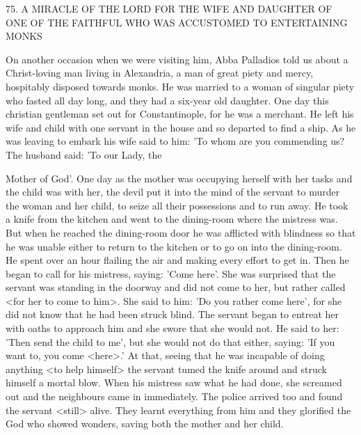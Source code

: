 75. A MIRACLE OF THE LORD FOR THE WIFE
AND DAUGHTER OF ONE OF THE FAITHFUL WHO
WAS ACCUSTOMED TO ENTERTAINING MONKS

On another occasion when we were visiting him, Abba Palladios
told us about a Christ-loving man living in Alexandria, a man of
great piety and mercy, hospitably disposed towards monks. He was
married to a woman of singular piety who fasted all day long, and
they had a six-year old daughter. One day this christian gentleman
set out for Constantinople, for he was a merchant. He left his wife
and child with one servant in the house and so departed to find a
ship. As he was leaving to embark his wife said to him: 'To whom
are you commending us? The husband said: 'To our Lady, the

Mother of God'. One day as the mother was occupying herself with
her tasks and the child was with her, the devil put it into the mind
of the servant to murder the woman and her child, to seize all their
possessions and to run away. He took a knife from the kitchen and
went to the dining-room where the mistress was. But when he
reached the dining-room door he was afflicted with blindness so that
he was unable either to return to the kitchen or to go on into the
dining-room. He spent over an hour flailing the air and making
every effort to get in. Then he began to call for his mistress, saying:
'Come here'. She was surprised that the servant was standing in the
doorway and did not come to her, but rather called <for her to
come to him>. She said to him: 'Do you rather come here', for she
did not know that he had been struck blind. The servant began to
entreat her with oaths to approach him and she swore that she
would not. He said to her: 'Then send the child to me', but she
would not do that either, saying: 'If you want to, you come
<here>.' At that, seeing that he was incapable of doing anything
<to help himself> the servant tumed the knife around and struck
himself a mortal blow. When his mistress saw what he had done,
she screamed out and the neighbours came in immediately. The
police arrived too and found the servant <still> alive. They learnt
everything from him and they glorified the God who showed
wonders, saving both the mother and her child.

